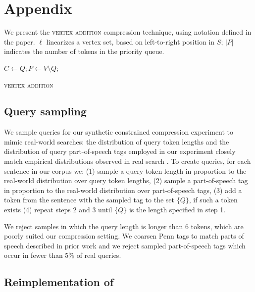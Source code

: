 \appendix


\section{Appendix}

We present the \textsc{vertex addition} compression technique, using notation defined in the paper. $\ell$ linearizes a vertex set, based on left-to-right position in $S$; $|P|$ indicates the number of tokens in the priority queue.

\begin{algorithm}[]
\SetAlgoLined
{}
 $ C \gets Q;  P \gets V \setminus Q$; \\
 \caption{\textsc{vertex addition}}
\end{algorithm}\label{a:algo}


\subsection{Query sampling}
We sample queries for our synthetic constrained compression experiment to mimic real-world searches: the distribution of query token lengths and the distribution of query part-of-speech tags employed in our experiment closely match empirical distributions observed in real search \cite{Jansen2000RealLR,Barr2008TheLS}. To create queries, for each sentence in our corpus we: (1) sample a query token length in proportion to the real-world distribution over query token lengths, (2) sample a part-of-speech tag in proportion to the real-world distribution over part-of-speech tags, (3) add a token from the sentence with the sampled tag to the set $\{Q\}$, if such a token exists (4) repeat steps 2 and 3 until $\{Q\}$ is the length specified in step 1.
 
We reject samples in which the query length is longer than 6 tokens, which are poorly suited our compression setting. We coarsen Penn tags to match parts of speech described in prior work and we reject sampled part-of-speech tags which occur in fewer than 5\% of real queries.

\subsection{Reimplementation of \citet{filippova2013overcoming}}

